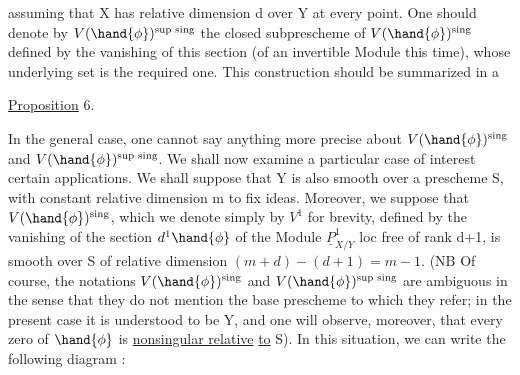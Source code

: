 
assuming that X has relative dimension d over Y at every point. One should
denote by  $V(\hand{\phi})^{\text{sup sing}}$ the closed subprescheme of
 $V(\hand{\phi})^{\text{sing}}$  defined by the vanishing of this section (of an invertible
Module this time), whose underlying set is the required one.
This construction should be summarized in a

\uline{Proposition} 6.

In the general case, one cannot  say anything more precise about
$V(\hand{\phi})^{\text{sing}}$ and $V(\hand{\phi})^{\text{sup sing}}$. We shall now examine a particular
case\hand{,} of interest  certain applications. We shall suppose
that Y is also smooth over a prescheme S, with constant relative
dimension m to fix ideas. Moreover, we suppose that $V(\hand{\phi})^{\text{sing}}$,
which we denote simply by $V^1$ for brevity, defined by the vanishing
of the section $d^1\hand{\phi}$ of the Module $\underline{P}^1_{X/Y}$  loc free of  rank d+1,
is smooth over S of relative dimension $(m+d) - (d+1) = m-1$. (NB Of
course, the notations $V(\hand{\phi})^{\text{sing}}$ and $V(\hand{\phi})^{\text{sup sing}}$ are ambiguous in the sense
that they do not mention the base prescheme  to which they
refer; in the present case it is understood to be Y,
and one will observe, moreover,  that every  zero of $\hand{\phi}$ is \uline{nonsingular relative}
\uline{to} S). In this situation, we can write the following diagram
:

